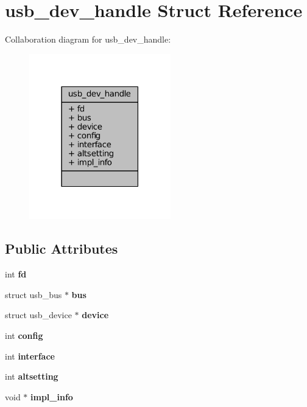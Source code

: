 \hypertarget{structusb__dev__handle}{}\section{usb\+\_\+dev\+\_\+handle Struct Reference}
\label{structusb__dev__handle}


Collaboration diagram for usb\+\_\+dev\+\_\+handle\+:\nopagebreak
\begin{figure}[H]
\begin{center}
\leavevmode
\includegraphics[width=174pt]{structusb__dev__handle__coll__graph}
\end{center}
\end{figure}
\subsection*{Public Attributes}
\begin{DoxyCompactItemize}
\item 
\mbox{\label{structusb__dev__handle_a950bc8d46963caa443fb27cf2ee2b811}} 
int {\bfseries fd}
\item 
\mbox{\label{structusb__dev__handle_a1e6baaed3dc1558ff34555200dd32a17}} 
struct usb\+\_\+bus $\ast$ {\bfseries bus}
\item 
\mbox{\label{structusb__dev__handle_a5557c3388ca9582e186b9ec20bdd480d}} 
struct usb\+\_\+device $\ast$ {\bfseries device}
\item 
\mbox{\label{structusb__dev__handle_aad569349383a9fc8ac71d5bcce7909de}} 
int {\bfseries config}
\item 
\mbox{\label{structusb__dev__handle_a2b7e997cdb4735e3b2c1fc58b81cee03}} 
int {\bfseries interface}
\item 
\mbox{\label{structusb__dev__handle_a822bc050950231b58e041f33a28d349c}} 
int {\bfseries altsetting}
\item 
\mbox{\label{structusb__dev__handle_ab08f2af9083159ae86648eae05b52c01}} 
void $\ast$ {\bfseries impl\+\_\+info}
\end{DoxyCompactItemize}


